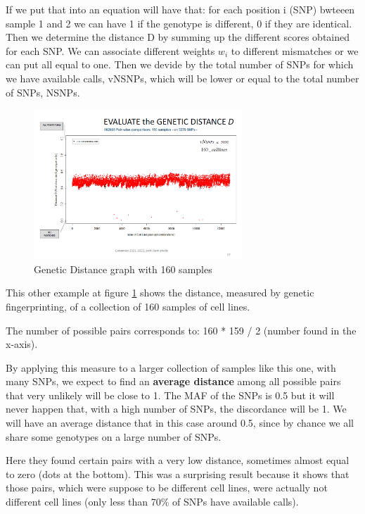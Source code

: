 If we put that into an equation will have that: for each position i (SNP) bwteeen sample 1 and 2 we can have 1 if the genotype is different, 0 if they are identical. Then we determine the distance D by summing up the different scores obtained for each SNP. We can associate different weights $w_i$ to different mismatches or we can put all equal to one. Then we devide by the total number of SNPs for which we have available calls, vNSNPs, which will be lower or equal to the total number of SNPs, NSNPs. 

%
\begin{figure}
	\centering
	\includegraphics[width=0.7\textwidth]{Distance2.PNG}
	\caption{\label{fig:Distance2}Genetic Distance graph with 160 samples}
\end{figure}

\bigskip
This other example at figure \ref{fig:Distance2} shows the distance, measured by genetic fingerprinting, of a collection of 160 samples of cell lines. 

The number of possible pairs corresponds to: 160 * 159 / 2 (number found in the x-axis). 

By applying this measure to a larger collection of samples like this one, with many SNPs, we expect to find an \textbf{average distance} among all possible pairs that very unlikely will be close to 1. 
The MAF of the SNPs is 0.5 but it will never happen that, with a high number of SNPs, the discordance will be 1. We will have an average distance that in this case around 0.5, since by chance we all share some genotypes on a large number of SNPs. 

Here they found certain pairs with a very low distance, sometimes almost equal to zero (dots at the bottom). This was a surprising result because it shows that those pairs, which were suppose to be different cell lines, were actually not different cell lines (only less than 70\% of SNPs have available calls). 


